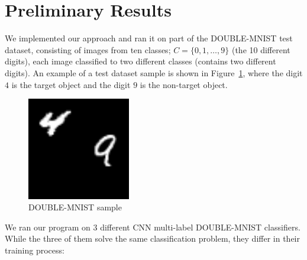 \documentclass[11pt]{article}
\begin{document}
\section{Preliminary Results}
We implemented our approach and ran it on part of the DOUBLE-MNIST test dataset, consisting of images from ten classes;
$C = \{0, 1, \ldots,9\}$ (the 10 different digits), each image classified to two different classes (contains two different digits).
An example of a test dataset sample is shown in Figure~\ref{fig:double-mnist-sample}, where the digit $4$ is the target object and the digit $9$ is the non-target object.
\begin{figure}
    \centering
    \includegraphics[width=0.4\textwidth]{3.png}
    \caption{DOUBLE-MNIST sample}
    \label{fig:double-mnist-sample}
\end{figure}

We ran our program on 3 different CNN multi-label DOUBLE-MNIST classifiers.
While the three of them solve the same classification problem, they differ in their training process:
\end{document}
